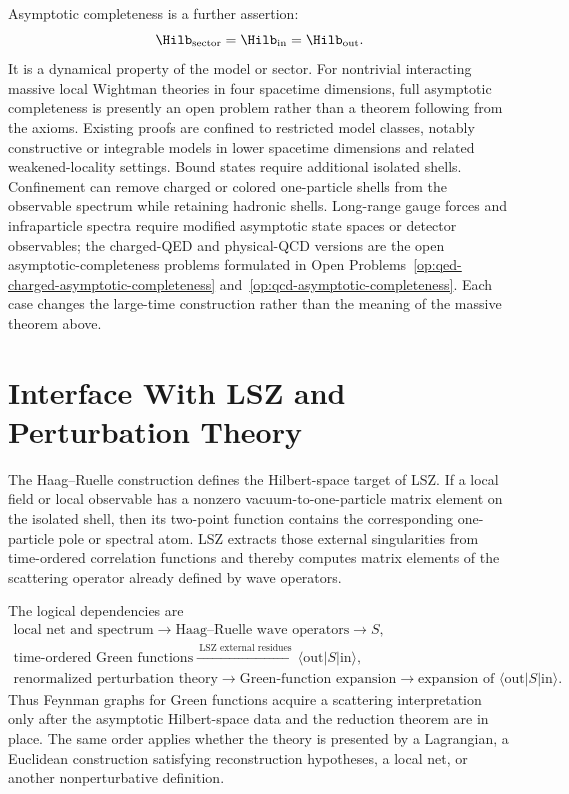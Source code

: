 Asymptotic completeness is a further assertion:
\[
  \Hilb_{\rm sector}=\Hilb_{\mathrm{in}}=\Hilb_{\mathrm{out}}.
\]
It is a dynamical property of the model or sector.  For nontrivial interacting
massive local Wightman theories in four spacetime dimensions, full asymptotic
completeness is presently an open problem rather than a theorem following from
the axioms.  Existing proofs are confined to restricted model classes, notably
constructive or integrable models in lower spacetime dimensions and related
weakened-locality settings.  Bound states require additional isolated shells.
Confinement can remove charged or colored one-particle shells from the
observable spectrum while retaining hadronic shells.  Long-range gauge forces
and infraparticle spectra require modified asymptotic state spaces or detector
observables; the charged-QED and physical-QCD versions are the open
asymptotic-completeness problems formulated in
Open Problems~\ref{op:qed-charged-asymptotic-completeness}
and~\ref{op:qcd-asymptotic-completeness}.  Each case changes the large-time
construction rather than the meaning of the massive theorem above.

\section{Interface With LSZ and Perturbation Theory}

The Haag--Ruelle construction defines the Hilbert-space target of LSZ.  If a
local field or local observable has a nonzero vacuum-to-one-particle matrix
element on the isolated shell, then its two-point function contains the
corresponding one-particle pole or spectral atom.  LSZ extracts those external
singularities from time-ordered correlation functions and thereby computes
matrix elements of the scattering operator already defined by wave operators.

The logical dependencies are
\[
\begin{gathered}
  \text{local net and spectrum}
  \longrightarrow
  \text{Haag--Ruelle wave operators}
  \longrightarrow S,
  \\[0.35em]
  \text{time-ordered Green functions}
  \xrightarrow{\ \text{LSZ external residues}\ }
  \langle{\mathrm{out}}|S|{\mathrm{in}}\rangle,
  \\[0.35em]
  \text{renormalized perturbation theory}
  \longrightarrow
  \text{Green-function expansion}
  \longrightarrow
  \text{expansion of } \langle{\mathrm{out}}|S|{\mathrm{in}}\rangle .
\end{gathered}
\]
Thus Feynman graphs for Green functions acquire a scattering interpretation
only after the asymptotic Hilbert-space data and the reduction theorem are in
place.  The same order applies whether the theory is presented by a
Lagrangian, a Euclidean construction satisfying reconstruction hypotheses, a
local net, or another nonperturbative definition.
